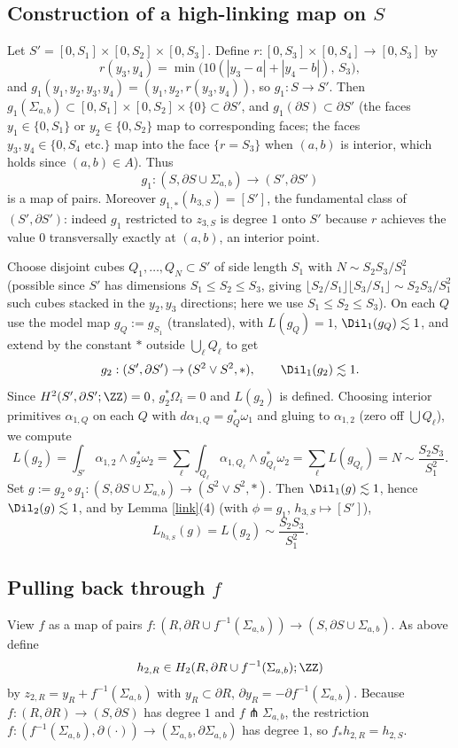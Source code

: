 \subsection*{Construction of a high-linking map on $S$}
Let $S'=[0,S_1]\times[0,S_2]\times[0,S_3]$. Define $r:[0,S_3]\times[0,S_4]\to[0,S_3]$ by
\[
r(y_3,y_4)=\min\big(10(|y_3-a|+|y_4-b|),\,S_3\big),
\]
and $g_1(y_1,y_2,y_3,y_4)=(y_1,y_2,r(y_3,y_4))$, so $g_1:S\to S'$. Then $g_1(\Sigma_{a,b})\subset[0,S_1]\times[0,S_2]\times\{0\}\subset\partial S'$, and $g_1(\partial S)\subset\partial S'$ (the faces $y_1\in\{0,S_1\}$ or $y_2\in\{0,S_2\}$ map to corresponding faces; the faces $y_3,y_4\in\{0,S_4\text{ etc.}\}$ map into the face $\{r=S_3\}$ when $(a,b)$ is interior, which holds since $(a,b)\in A$). Thus
\[
g_1:(S,\partial S\cup\Sigma_{a,b})\to(S',\partial S')
\]
is a map of pairs. Moreover $g_{1,*}(h_{3,S})=[S']$, the fundamental class of $(S',\partial S')$: indeed $g_1$ restricted to $z_{3,S}$ is degree $1$ onto $S'$ because $r$ achieves the value $0$ transversally exactly at $(a,b)$, an interior point.

Choose disjoint cubes $Q_1,\dots,Q_N\subset S'$ of side length $S_1$ with $N\sim S_2S_3/S_1^2$ (possible since $S'$ has dimensions $S_1\le S_2\le S_3$, giving $\lfloor S_2/S_1\rfloor\lfloor S_3/S_1\rfloor\sim S_2S_3/S_1^2$ such cubes stacked in the $y_2,y_3$ directions; here we use $S_1\le S_2\le S_3$). On each $Q$ use the model map $g_Q:=g_{S_1}$ (translated), with $L(g_Q)=1$, $\Dil_1(g_Q)\lesssim 1$, and extend by the constant $*$ outside $\bigcup_\ell Q_\ell$ to get
\[
g_2:(S',\partial S')\to(S^2\vee S^2,*),\qquad \Dil_1(g_2)\lesssim 1 .
\]
Since $H^2(S',\partial S';\ZZ)=0$, $g_2^*\Omega_i=0$ and $L(g_2)$ is defined. Choosing interior primitives $\alpha_{1,Q}$ on each $Q$ with $d\alpha_{1,Q}=g_Q^*\omega_1$ and gluing to $\alpha_{1,2}$ (zero off $\bigcup Q_\ell$), we compute
\[
L(g_2)=\int_{S'}\alpha_{1,2}\wedge g_2^*\omega_2=\sum_\ell\int_{Q_\ell}\alpha_{1,Q_\ell}\wedge g_{Q_\ell}^*\omega_2=\sum_\ell L(g_{Q_\ell})=N\sim\frac{S_2S_3}{S_1^2}.
\]
Set $g:=g_2\circ g_1:(S,\partial S\cup\Sigma_{a,b})\to(S^2\vee S^2,*)$. Then $\Dil_1(g)\lesssim1$, hence $\Dil_2(g)\lesssim1$, and by Lemma \ref{link}(4) (with $\phi=g_1$, $h_{3,S}\mapsto[S']$),
\[
L_{h_{3,S}}(g)=L(g_2)\sim\frac{S_2S_3}{S_1^2}.
\]

\subsection*{Pulling back through $f$}
View $f$ as a map of pairs $f:(R,\partial R\cup f^{-1}(\Sigma_{a,b}))\to(S,\partial S\cup\Sigma_{a,b})$. As above define
\[
h_{2,R}\in H_2(R,\partial R\cup f^{-1}(\Sigma_{a,b});\ZZ)
\]
by $z_{2,R}=y_R+f^{-1}(\Sigma_{a,b})$ with $y_R\subset\partial R$, $\partial y_R=-\partial f^{-1}(\Sigma_{a,b})$. Because $f:(R,\partial R)\to(S,\partial S)$ has degree $1$ and $f\pitchfork\Sigma_{a,b}$, the restriction $f:(f^{-1}(\Sigma_{a,b}),\partial(\cdot))\to(\Sigma_{a,b},\partial\Sigma_{a,b})$ has degree $1$, so $f_*h_{2,R}=h_{2,S}$.

